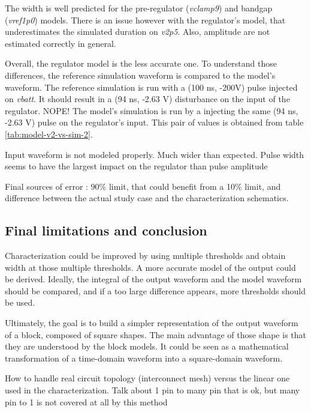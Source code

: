 The width is well predicted for the pre-regulator (\textit{vclamp9}) and bandgap (\textit{vref1p0}) models.
There is an issue however with the regulator's model, that underestimates the simulated duration on \textit{v2p5}.
Also, amplitude are not estimated correctly in general.

Overall, the regulator model is the less accurate one.
To understand those differences, the reference simulation waveform is compared to the model's waveform.
The reference simulation is run with a (100 ns, -200V) pulse injected on \textit{vbatt}.
It should result in a (94 ns, -2.63 V) disturbance on the input of the regulator. NOPE!
The model's simulation is run by a injecting the same (94 ns, -2.63 V) pulse on the regulator's input.
This pair of values is obtained from table \ref{tab:model-v2-vs-sim-2}.



Input waveform is not modeled properly. Much wider than expected.
Pulse width seems to have the largest impact on the regulator than pulse amplitude

Final sources of error : 90\% limit, that could benefit from a 10\% limit, and difference between the actual study case and the characterization schematics.

\subsection{Final limitations and conclusion}

Characterization could be improved by using multiple thresholds and obtain width at those multiple thresholds.
A more accurate model of the output could be derived.
Ideally, the integral of the output waveform and the model waveform should be compared, and if a too large difference appears, more thresholds should be used.


Ultimately, the goal is to build a simpler representation of the output waveform of a block, composed of square shapes.
The main advantage of those shape is that they are understood by the block models.
It could be seen as a mathematical transformation of a time-domain waveform into a square-domain waveform.

How to handle real circuit topology (interconnect mesh) versus the linear one used in the characterization.
Talk about 1 pin to many pin that is ok, but many pin to 1 is not covered at all by this method
